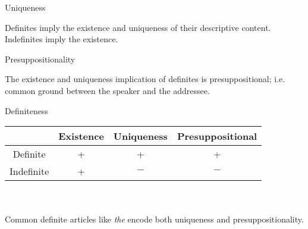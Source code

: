 \documentclass[10pt]{beamer}
\begin{document}
\begin {frame} {Uniqueness}

Definites imply the existence and \alert{uniqueness} of their descriptive content. \pause \\ Indefinites imply the existence.

\end {frame}

%
%
%
%
%
%
%
%
%
%
%
%
%
%

\begin {frame} {Presuppositionality}

The existence and uniqueness implication of definites is presuppositional; i.e. common ground between the speaker and the addressee. 

\end {frame}

\begin {frame} {Definiteness}

\begin {tabular} {c | c | c|c}
 & Existence & Uniqueness & Presuppositional \\ \hline
Definite & + & + & + \\
Indefinite & + & $-$ & $-$ \\ 
\end {tabular}
\pause
~\\~\\Common definite articles like \emph{the} encode both uniqueness and presuppositionality. \\   

\end {frame}
\end{document}
